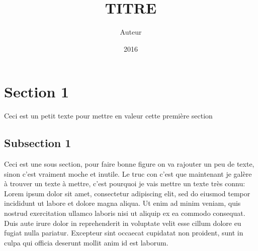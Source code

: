 \documentclass[a4paper,11pt]{report}
\begin{document}

{\selectfont%
\title{TITRE}
\author{Auteur}
\date{2016}

}
\maketitle
\clearpage
\tableofcontents
\clearpage
\section{Section 1}
Ceci est un petit texte pour mettre en valeur cette première section
\subsection{Subsection 1}
Ceci est une sous section, pour faire bonne figure on va rajouter un peu de texte, sinon c'est vraiment moche et inutile. Le truc con c'est que maintenant je galère à trouver un texte à mettre, c'est pourquoi je vais mettre un texte très connu:
Lorem ipsum dolor sit amet, consectetur adipiscing elit, sed do eiusmod tempor incididunt ut labore et dolore magna aliqua. Ut enim ad minim veniam, quis nostrud exercitation ullamco laboris nisi ut aliquip ex ea commodo consequat. Duis aute irure dolor in reprehenderit in voluptate velit esse cillum dolore eu fugiat nulla pariatur. Excepteur sint occaecat cupidatat non proident, sunt in culpa qui officia deserunt mollit anim id est laborum.
\end{document}
